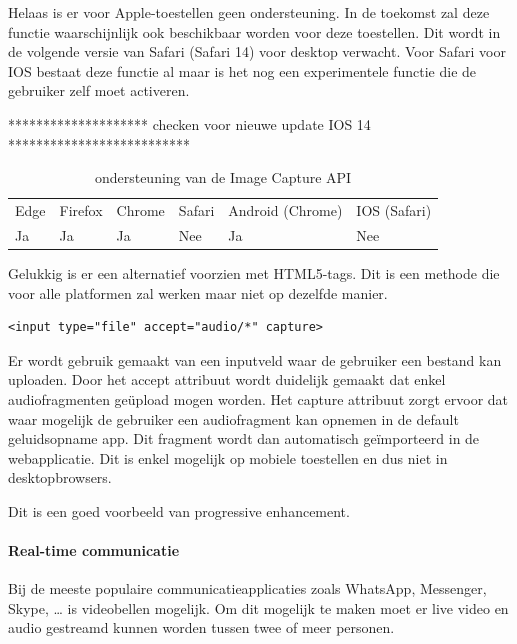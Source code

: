 Helaas is er voor Apple-toestellen geen ondersteuning. In de toekomst zal deze functie waarschijnlijk ook beschikbaar worden voor deze toestellen. Dit wordt in de volgende versie van Safari (Safari 14) voor desktop verwacht. Voor Safari voor IOS bestaat deze functie al maar is het nog een experimentele functie die de gebruiker zelf moet activeren.


******************** checken voor nieuwe update IOS 14 **************************

\begin{table}[H]
	\centering
	\begin{tabular}{llllll}
		Edge & Firefox & Chrome & Safari & Android (Chrome) & IOS (Safari) \\
		Ja   & Ja      & Ja     & Nee     & Ja               & Nee          
	\end{tabular}	
	\caption{ondersteuning van de Image Capture API}
	\label{ondersteuning van de Image Capture API}
\end{table}

Gelukkig is er een alternatief voorzien met HTML5-tags. Dit is een methode die voor alle platformen zal werken maar niet op dezelfde manier.

\begin{lstlisting}
<input type="file" accept="audio/*" capture>
\end{lstlisting}

Er wordt gebruik gemaakt van een inputveld waar de gebruiker een bestand kan uploaden. Door het accept attribuut wordt duidelijk gemaakt dat enkel audiofragmenten geüpload mogen worden. Het capture attribuut zorgt ervoor dat waar mogelijk de gebruiker een audiofragment kan opnemen in de default geluidsopname app. Dit fragment wordt dan automatisch geïmporteerd in de webapplicatie. Dit is enkel mogelijk op mobiele toestellen en dus niet in desktopbrowsers.

\autocite{Kinlan2019}

Dit is een goed voorbeeld van progressive enhancement. 



\paragraph{Real-time communicatie }



Bij de meeste populaire communicatieapplicaties zoals WhatsApp, Messenger, Skype, … is videobellen mogelijk. Om dit mogelijk te maken moet er live video en audio gestreamd kunnen worden tussen twee of meer personen.

